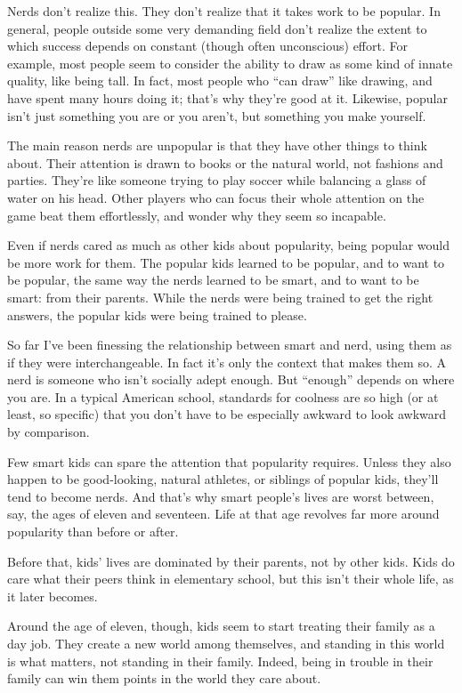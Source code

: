 \documentclass[12pt]{book}
\begin{document}
Nerds don't realize this. They don't realize that it takes work to be
popular. In general, people outside some very demanding field don't
realize the extent to which success depends on constant (though often
unconscious) effort. For example, most people seem to consider the
ability to draw as some kind of innate quality, like being tall. In
fact, most people who ``can draw'' like drawing, and have spent many
hours doing it; that's why they're good at it. Likewise, popular isn't
just something you are or you aren't, but something you make yourself.

The main reason nerds are unpopular is that they have other things to
think about. Their attention is drawn to books or the natural world, not
fashions and parties. They're like someone trying to play soccer while
balancing a glass of water on his head. Other players who can focus
their whole attention on the game beat them effortlessly, and wonder why
they seem so incapable.

Even if nerds cared as much as other kids about popularity, being
popular would be more work for them. The popular kids learned to be
popular, and to want to be popular, the same way the nerds learned to be
smart, and to want to be smart: from their parents. While the nerds were
being trained to get the right answers, the popular kids were being
trained to please.

So far I've been finessing the relationship between smart and nerd,
using them as if they were interchangeable. In fact it's only the
context that makes them so. A nerd is someone who isn't socially adept
enough. But ``enough'' depends on where you are. In a typical American
school, standards for coolness are so high (or at least, so specific)
that you don't have to be especially awkward to look awkward by
comparison.

Few smart kids can spare the attention that popularity requires. Unless
they also happen to be good-looking, natural athletes, or siblings of
popular kids, they'll tend to become nerds. And that's why smart
people's lives are worst between, say, the ages of eleven and seventeen.
Life at that age revolves far more around popularity than before or
after.

Before that, kids' lives are dominated by their parents, not by other
kids. Kids do care what their peers think in elementary school, but this
isn't their whole life, as it later becomes.

Around the age of eleven, though, kids seem to start treating their
family as a day job. They create a new world among themselves, and
standing in this world is what matters, not standing in their family.
Indeed, being in trouble in their family can win them points in the
world they care about.
\end{document}
